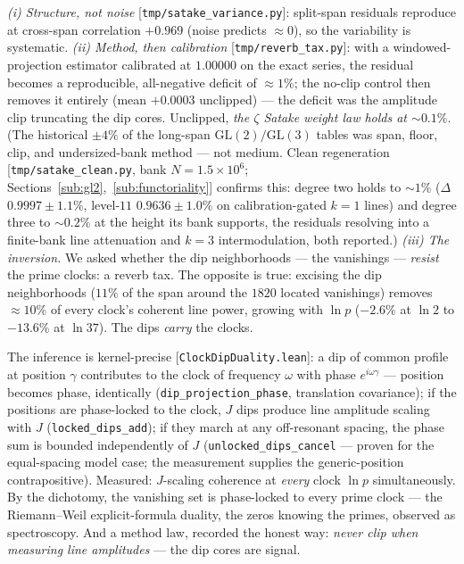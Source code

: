 \documentclass[11pt]{article}
\newcommand{\code}[1]{\texttt{#1}}
\begin{document}
\emph{(i) Structure, not noise} [\code{tmp/satake\_variance.py}]: split-span residuals reproduce
at cross-span correlation $+0.969$ (noise predicts $\approx0$), so the variability is systematic.
\emph{(ii) Method, then calibration} [\code{tmp/reverb\_tax.py}]: with a windowed-projection
estimator calibrated at $1.00000$ on the exact series, the residual becomes a reproducible,
all-negative deficit of ${\approx}1\%$; the no-clip control then removes it entirely (mean
$+0.0003$ unclipped) --- the deficit was the amplitude clip truncating the dip cores.  Unclipped,
\emph{the $\zeta$ Satake weight law holds at ${\sim}0.1\%$}.  (The historical $\pm4\%$ of the
long-span $\mathrm{GL}(2)/\mathrm{GL}(3)$ tables was span, floor, clip, and undersized-bank method
--- not medium.  Clean regeneration [\code{tmp/satake\_clean.py}, bank $N=1.5\times10^{6}$;
Sections~\ref{sub:gl2},~\ref{sub:functoriality}] confirms this: degree two holds to ${\sim}1\%$
($\Delta$ $0.9997\pm1.1\%$, level-$11$ $0.9636\pm1.0\%$ on calibration-gated $k=1$ lines) and
degree three to ${\sim}0.2\%$ at the height its bank supports, the residuals resolving into a
finite-bank line attenuation and $k=3$ intermodulation, both reported.)  \emph{(iii) The inversion.}  We asked whether the dip neighborhoods --- the
vanishings --- \emph{resist} the prime clocks: a reverb tax.  The opposite is true: excising the
dip neighborhoods ($11\%$ of the span around the $1820$ located vanishings) removes
${\approx}10\%$ of every clock's coherent line power, growing with $\ln p$ ($-2.6\%$ at $\ln2$ to
$-13.6\%$ at $\ln37$).  The dips \emph{carry} the clocks.

The inference is kernel-precise [\code{ClockDipDuality.lean}]: a dip of common profile at position
$\gamma$ contributes to the clock of frequency $\omega$ with phase $e^{i\omega\gamma}$ ---
position becomes phase, identically (\code{dip\_projection\_phase}, translation covariance); if
the positions are phase-locked to the clock, $J$ dips produce line amplitude scaling with $J$
(\code{locked\_dips\_add}); if they march at any off-resonant spacing, the phase sum is bounded
independently of $J$ (\code{unlocked\_dips\_cancel} --- proven for the equal-spacing model case;
the measurement supplies the generic-position contrapositive).  Measured: $J$-scaling coherence at
\emph{every} clock $\ln p$ simultaneously.  By the dichotomy, the vanishing set is phase-locked to
every prime clock --- the Riemann--Weil explicit-formula duality, the zeros knowing the primes,
observed as spectroscopy.  And a method law, recorded the honest way: \emph{never clip when
measuring line amplitudes} --- the dip cores are signal.
\end{document}
